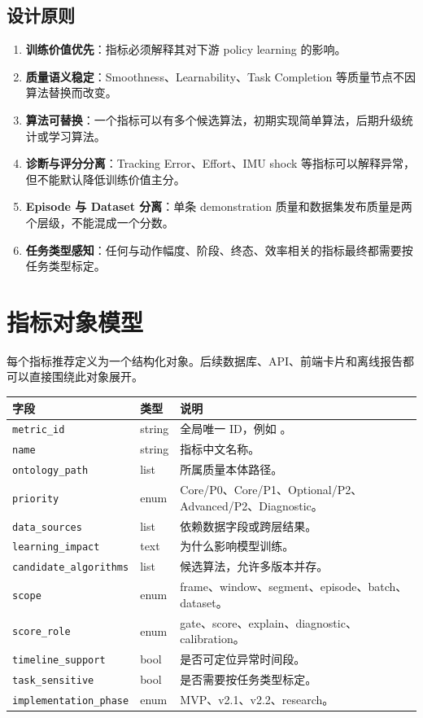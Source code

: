 \documentclass[UTF8,zihao=-4,oneside,openany]{ctexrep}
\newcommand{\Code}[1]{\texttt{#1}}
\newcommand{\MID}[1]{\texttt{\seqsplit{#1}}}
\newcommand{\Term}[1]{\textbf{#1}}
\begin{document}
\subsection{设计原则}

\begin{enumerate}
  \item \Term{训练价值优先}：指标必须解释其对下游 policy learning 的影响。
  \item \Term{质量语义稳定}：Smoothness、Learnability、Task Completion 等质量节点不因算法替换而改变。
  \item \Term{算法可替换}：一个指标可以有多个候选算法，初期实现简单算法，后期升级统计或学习算法。
  \item \Term{诊断与评分分离}：Tracking Error、Effort、IMU shock 等指标可以解释异常，但不能默认降低训练价值主分。
  \item \Term{Episode 与 Dataset 分离}：单条 demonstration 质量和数据集发布质量是两个层级，不能混成一个分数。
  \item \Term{任务类型感知}：任何与动作幅度、阶段、终态、效率相关的指标最终都需要按任务类型标定。
\end{enumerate}

\section{指标对象模型}

每个指标推荐定义为一个结构化对象。后续数据库、API、前端卡片和离线报告都可以直接围绕此对象展开。

\begin{longtable}{L{3.8cm} L{2.7cm} L{7.0cm}}
\toprule
字段 & 类型 & 说明 \\
\midrule
\Code{metric\_id} & string & 全局唯一 ID，例如 \MID{DBQ-01}。 \\
\Code{name} & string & 指标中文名称。 \\
\Code{ontology\_path} & list & 所属质量本体路径。 \\
\Code{priority} & enum & Core/P0、Core/P1、Optional/P2、Advanced/P2、Diagnostic。 \\
\Code{data\_sources} & list & 依赖数据字段或跨层结果。 \\
\Code{learning\_impact} & text & 为什么影响模型训练。 \\
\Code{candidate\_algorithms} & list & 候选算法，允许多版本并存。 \\
\Code{scope} & enum & frame、window、segment、episode、batch、dataset。 \\
\Code{score\_role} & enum & gate、score、explain、diagnostic、calibration。 \\
\Code{timeline\_support} & bool & 是否可定位异常时间段。 \\
\Code{task\_sensitive} & bool & 是否需要按任务类型标定。 \\
\Code{implementation\_phase} & enum & MVP、v2.1、v2.2、research。 \\
\bottomrule
\end{longtable}
\end{document}
